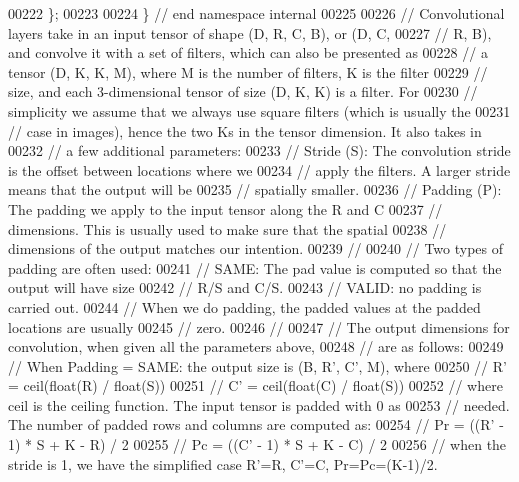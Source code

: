 \begin{DoxyCode}
00222 \};
00223 
00224 \}  \textcolor{comment}{// end namespace internal}
00225 
00226 \textcolor{comment}{// Convolutional layers take in an input tensor of shape (D, R, C, B), or (D, C,}
00227 \textcolor{comment}{// R, B), and convolve it with a set of filters, which can also be presented as}
00228 \textcolor{comment}{// a tensor (D, K, K, M), where M is the number of filters, K is the filter}
00229 \textcolor{comment}{// size, and each 3-dimensional tensor of size (D, K, K) is a filter. For}
00230 \textcolor{comment}{// simplicity we assume that we always use square filters (which is usually the}
00231 \textcolor{comment}{// case in images), hence the two Ks in the tensor dimension.  It also takes in}
00232 \textcolor{comment}{// a few additional parameters:}
00233 \textcolor{comment}{// Stride (S): The convolution stride is the offset between locations where we}
00234 \textcolor{comment}{//             apply the filters.  A larger stride means that the output will be}
00235 \textcolor{comment}{//             spatially smaller.}
00236 \textcolor{comment}{// Padding (P): The padding we apply to the input tensor along the R and C}
00237 \textcolor{comment}{//              dimensions.  This is usually used to make sure that the spatial}
00238 \textcolor{comment}{//              dimensions of the output matches our intention.}
00239 \textcolor{comment}{//}
00240 \textcolor{comment}{// Two types of padding are often used:}
00241 \textcolor{comment}{//   SAME: The pad value is computed so that the output will have size}
00242 \textcolor{comment}{//         R/S and C/S.}
00243 \textcolor{comment}{//   VALID: no padding is carried out.}
00244 \textcolor{comment}{// When we do padding, the padded values at the padded locations are usually}
00245 \textcolor{comment}{// zero.}
00246 \textcolor{comment}{//}
00247 \textcolor{comment}{// The output dimensions for convolution, when given all the parameters above,}
00248 \textcolor{comment}{// are as follows:}
00249 \textcolor{comment}{// When Padding = SAME: the output size is (B, R', C', M), where}
00250 \textcolor{comment}{//   R' = ceil(float(R) / float(S))}
00251 \textcolor{comment}{//   C' = ceil(float(C) / float(S))}
00252 \textcolor{comment}{// where ceil is the ceiling function.  The input tensor is padded with 0 as}
00253 \textcolor{comment}{// needed.  The number of padded rows and columns are computed as:}
00254 \textcolor{comment}{//   Pr = ((R' - 1) * S + K - R) / 2}
00255 \textcolor{comment}{//   Pc = ((C' - 1) * S + K - C) / 2}
00256 \textcolor{comment}{// when the stride is 1, we have the simplified case R'=R, C'=C, Pr=Pc=(K-1)/2.}

\end{DoxyCode}

